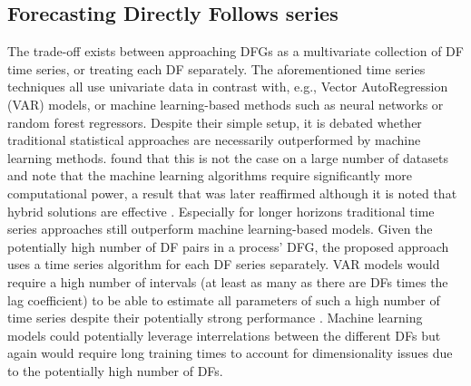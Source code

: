 \subsection{Forecasting Directly Follows series}
The trade-off exists between approaching DFGs as a multivariate collection of DF time series, or treating each DF separately.
The aforementioned time series techniques all use univariate data in contrast with, e.g., Vector AutoRegression (VAR) models, or machine learning-based methods such as neural networks or random forest regressors.
Despite their simple setup, it is debated whether traditional statistical approaches are necessarily outperformed by machine learning methods. 
\cite{makridakis2018statistical} found that this is not the case on a large number of datasets and note that the machine learning algorithms require significantly more computational power, a result that was later reaffirmed although it is noted that hybrid solutions are effective \cite{makridakis2020m4}.
Especially for longer horizons traditional time series approaches still outperform machine learning-based models.
Given the potentially high number of DF pairs in a process' DFG, the proposed approach uses a time series algorithm for each DF series separately.
VAR models would require a high number of intervals (at least as many as there are DFs times the lag coefficient) to be able to estimate all parameters of such a high number of time series despite their potentially strong performance \cite{thomakos2004naive}.
Machine learning models could potentially leverage interrelations between the different DFs but again would require long training times to account for dimensionality issues due to the potentially high number of DFs.